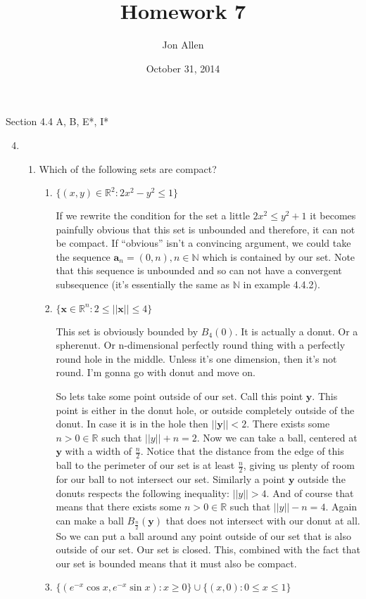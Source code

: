 \documentclass[letterpaper]{article}
\begin{document}
\title{Homework 7}
\date{October 31, 2014}
\author{Jon Allen}
\maketitle
Section 4.4  A, B, E*, I*
\renewcommand{\labelenumi}{4.\arabic{enumi}}
\renewcommand{\labelenumii}{\Alph{enumii}.}
\renewcommand{\labelenumiii}{(\alph{enumiii})}
\begin{enumerate}
\setcounter{enumi}{3}
\item
  \begin{enumerate}
  \item
    Which of the following sets are compact?
    \begin{enumerate}
    \item
      $\{(x,y)\in\mathbb{R}^2:2x^{2}-y^{2}\le 1\}$

      If we rewrite the condition for the set a little $2x^2\le y^2+1$ it becomes painfully obvious that this set is unbounded and therefore, it can not be compact.
      If ``obvious'' isn't a convincing argument, we could take the sequence $\boldsymbol{a}_n=(0,n), n\in \mathbb{N}$ which is contained by our set. Note that this sequence is unbounded and so can not have a convergent subsequence (it's essentially the same as $\mathbb{N}$ in example 4.4.2).
    \item
      $\{\boldsymbol{x}\in\mathbb{R}^n:2\le||\boldsymbol{x}||\le4\}$

      This set is obviously bounded by $B_4(0)$. It is actually a donut. Or a spherenut. Or n-dimensional perfectly round thing with a perfectly round hole in the middle. Unless it's one dimension, then it's not round. I'm gonna go with donut and move on.

      So lets take some point outside of our set.
      Call this point $\boldsymbol{y}$.
      This point is either in the donut hole, or outside completely outside of the donut.
      In case it is in the hole then $||\boldsymbol{y}||<2$.
      There exists some $n>0\in \mathbb{R}$ such that $||y||+n=2$.
      Now we can take a ball, centered at $\boldsymbol{y}$ with a width of $\frac{n}{2}$.
      Notice that the distance from the edge of this ball to the perimeter of our set is at least $\frac{n}{2}$, giving us plenty of room for our ball to not intersect our set.
      Similarly a point $\boldsymbol{y}$ outside the donuts respects the following inequality: $||y||>4$.
      And of course that means that there exists some $n>0\in \mathbb{R}$ such that $||y||-n=4$.
      Again can make a ball $B_{\frac{n}{2}}(\boldsymbol{y})$ that does not intersect with our donut at all.
      So we can put a ball around any point outside of our set that is also outside of our set.
      Our set is closed.
      This, combined with the fact that our set is bounded means that it must also be compact.
    \item
      $\{(e^{-x}\cos x,e^{-x}\sin x):x\ge 0\}\cup\{(x,0):0\le x\le 1\}$


\end{enumerate}
\end{enumerate}
\end{enumerate}
\end{document}
